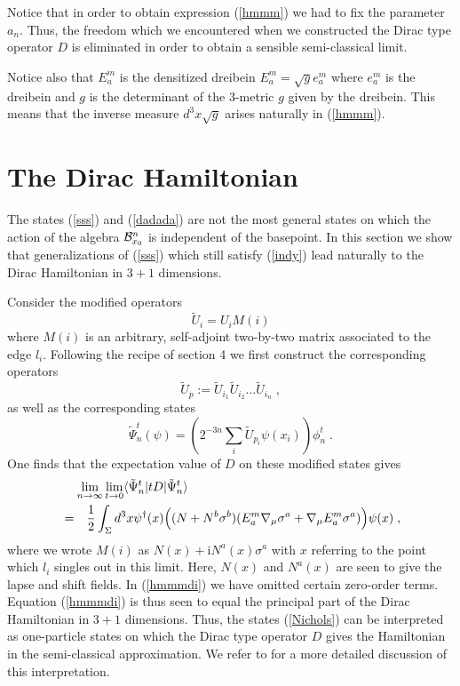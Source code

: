 \documentclass[12pt]{article}
\newcommand{\nn}{\nonumber}
\def\m{\mu}
\def\cb{{\cal B}}
\begin{document}
Notice that in order to obtain expression (\ref{hmmm}) we had to fix the parameter $a_n$. Thus, the freedom which we encountered when we constructed the Dirac type operator $D$ is eliminated in order to obtain a sensible semi-classical limit.

Notice also that $E^m_a$ is the densitized dreibein $E^m_a = \sqrt{g} e^m_a $ where $e^m_a$ is the dreibein and $g$ is the determinant of the 3-metric $g$ given by the dreibein. This means that the inverse measure $d^3x \sqrt{g}$ arises naturally in (\ref{hmmm}).



\section{The Dirac Hamiltonian}

The states (\ref{sss}) and (\ref{dadada}) are not the most general states on which the action of the algebra $\cb^n_{x_0}$ is independent of the basepoint. In this section we show that generalizations of (\ref{sss}) which still satisfy (\ref{indy}) lead naturally to the Dirac Hamiltonian in $3+1$ dimensions.

Consider the modified operators
$$
\tilde{U}_i = U_i M(i) 
$$
where $M(i)$ is an arbitrary, self-adjoint two-by-two matrix associated to the edge $l_i$. Following the recipe of section 4 we first construct the corresponding operators
\begin{equation}
\tilde{U}_p := \tilde{U}_{i_1}\tilde{U}_{i_2} \ldots \tilde{U}_{i_n}\;,
\label{Nichols}
\end{equation}
as well as the corresponding states
\begin{equation}
\tilde{\Psi}^t_n(\psi) = \left(2^{-3n}\sum_i \tilde{U}_{p_i} \psi(x_i)\right) \phi^t_n\;.
\label{dadadadi}
\end{equation}
One finds that the expectation value of $D$ on these modified states gives
\begin{eqnarray}
\lim_{n\rightarrow\infty}\lim_{t\rightarrow 0} \langle \tilde{\Psi}^t_n\vert t D \vert \tilde{\Psi}^t_n\rangle
\hspace{-3.6cm}&&\nonumber\\ &=& 
 \frac{1}{2}  \int_\Sigma d^3x  {\psi}^\dagger(x) \Big( (N + N^b \sigma^b)(E^m_a \nabla_\m \sigma^a  + \nabla_\m E^m_a  \sigma^a )   \Big) \psi(x) \;,
 \label{hmmmdi}
\end{eqnarray}
where we wrote $M(i)$ as $N(x)+ \mathrm{i}N^a(x)\sigma^a$ with $x$ referring to the point which $l_i$ singles out in this limit. Here, $N(x)$ and $N^a(x)$ are seen to give the lapse and shift fields.  In (\ref{hmmmdi}) we have omitted certain zero-order terms. Equation (\ref{hmmmdi}) is thus seen to equal the principal part of the Dirac Hamiltonian in $3+1$ dimensions. Thus, the states (\ref{Nichols}) can be interpreted as one-particle states on which the Dirac type operator $D$ gives the Hamiltonian in the semi-classical approximation.
We refer to \cite{AGNP1} for a more detailed discussion of this interpretation.
\end{document}
